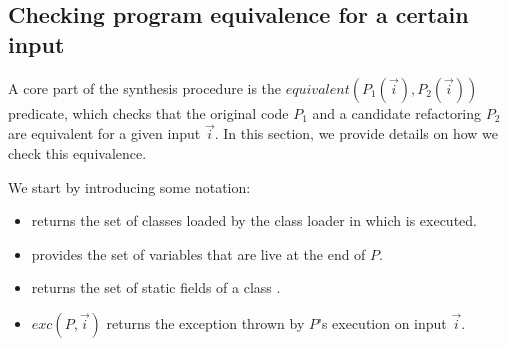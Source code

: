 \documentclass[sigconf,review,anonymous]{acmart}
\begin{document}
\subsection{Checking program equivalence for a certain input}\label{sec:equiv}

A core part of the synthesis procedure is the $equivalent(P_1(\vec{i}), P_2(\vec{i}))$ predicate,
which checks that the original code $P_1$ and a candidate refactoring $P_2$
are equivalent for a given input $\vec{i}$.
In this section, we provide details on how we check this equivalence.




We start by introducing some notation:
\begin{itemize}
\item {} returns the set of classes loaded by the class loader
  in which  is executed.
\item {} provides the set of variables that are live
at the end of $P$. %
\item {} returns
  the set of static fields of a class .
\item $exc(P, \vec{i})$ returns the exception thrown by $P$'s execution on input $\vec{i}$.  
\end{itemize}  
\end{document}
